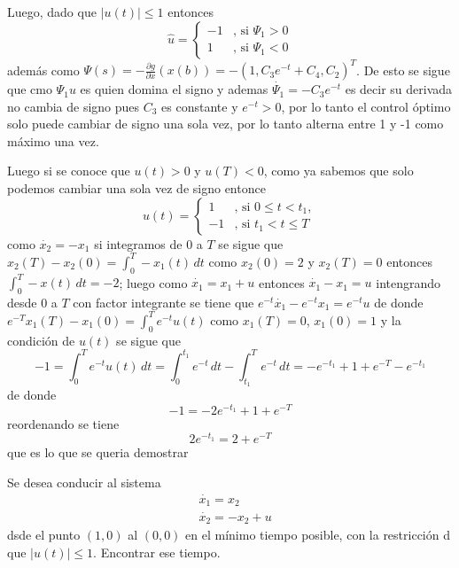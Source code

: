 \documentclass{ejercicios}
\begin{document}
\begin{solution}
Luego, dado que $\lvert u(t)\rvert\leq 1$ entonces 
\[
  \hat{u} = \begin{cases}
    -1 & \text{, si } \Psi_1>0 \\ 
    1 & \text{, si } \Psi_1 < 0
  \end{cases}
\]
además como $\Psi(s) = -\frac{\partial g}{\partial x}(x(b)) = -(1,C_3e^{-t}+C_4,C_2)^T$.
De esto se sigue que cmo $\Psi_1u$ es quien domina el signo y ademas $\dot{\Psi_1} = -C_3e^{-t}$ es decir su derivada no cambia de signo pues $C_3$ es constante y $e^{-t} > 0$, por lo tanto el control óptimo solo puede cambiar de signo una sola vez, por lo tanto alterna entre 1 y -1 como máximo una vez.

Luego si se conoce que $u(t) > 0$ y $u(T) < 0$, como ya sabemos que solo podemos cambiar una sola vez de signo entonce 
\[u(t) = 
  \begin{cases}
    1 & \text{, si }0\leq t < t_1,\\ 
    -1 & \text{, si }t_1 < t \leq T
  \end{cases}
\]
como $\dot{x_2} = -x_1$ si integramos de $0$ a $T$ se sigue que $x_2(T) - x_2(0) = \int_{0}^{T}-x_1(t)\,dt$ como $x_2(0) = 2$ y $x_2(T) = 0$ entonces $\int_{0}^{T}-x(t)\,dt = -2$; luego 
como $\dot{x_1} = x_1 + u$ entonces $\dot{x_1} - x_1 = u$ intengrando desde $0$ a $T$ con factor integrante se tiene que $e^{-t}\dot{x_1} - e^{-t}x_1 = e^{-t}u$ de donde 
$e^{-T}x_1(T) - x_1(0) = \int_{0}^{T}e^{-t}u(t)$ como $x_1(T) = 0$, $x_1(0) = 1$ y la condición de $u(t)$ se sigue que 
\[
  -1 = \int_{0}^{T}e^{-t}u(t)\,dt = \int_{0}^{t_1}e^{-t}\,dt - \int_{t_1}^{T}e^{-t}\,dt = -e^{-t_1} + 1 + e^{-T} - e^{-t_1}
\]
de donde 
\[-1 = -2e^{-t_1} + 1 + e^{-T}\]
reordenando se tiene 
\[2e^{-t_1} = 2 + e^{-T}\] 
que es lo que se queria demostrar
\end{solution}

\begin{exercise}
\noindent 
Se desea conducir al sistema 
\[
  \begin{aligned}
    & \dot{x_1} = x_2 \\ 
    & \dot{x_2} = -x_2 + u 
  \end{aligned}
\]
dsde el punto $(1,0)$ al $(0,0)$ en el mínimo tiempo posible, con la restricción d que $\lvert u(t)\rvert\leq 1$. Encontrar ese tiempo.
\end{exercise}
\end{document}
